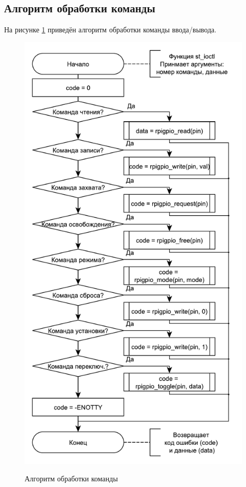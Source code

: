 \subsection{Алгоритм обработки команды}
На рисунке \ref{alg:command} приведён алгоритм обработки команды ввода/вывода.
\begin{figure}[h!] 
	\begin{center}
		{\includegraphics[scale=0.7, angle=0]{img/command.pdf}}
		\caption{Алгоритм обработки команды}
		\label{alg:command}
	\end{center}
\end{figure}

